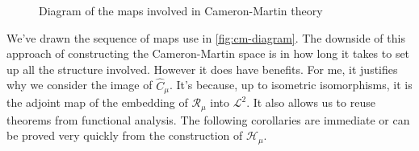 \documentclass[fontsize=12pt, DIV=10]{scrreprt}
\theoremstyle{remark}
\newcommand{\calB}{\mathcal B}
\newcommand{\calH}{\mathcal H}
\newcommand{\calL}{\mathcal L}
\newcommand{\calR}{\mathcal R}
\newcommand{\dif}[1]{\text{d} #1}
\DeclareMathOperator{\ev}{ev}
\DeclareMathOperator{\eq}{eq}
\newcommand{\mudif}{\ensuremath{\, \mu(\dif x)}}
\begin{document}
\begin{figure}
	\centering
	\label{fig:cm-diagram}
	\caption{Diagram of the maps involved in Cameron-Martin theory}
\end{figure}
We've drawn the sequence of maps use in \vref{fig:cm-diagram}. The downside of this approach of constructing the Cameron-Martin space is in how long it takes to set up all the structure involved. However it does have benefits. For me, it justifies why we consider the image of $\hat{C}_{\mu}$. It's because, up to isometric isomorphisms, it is the adjoint map of the embedding of $\calR_{\mu}$ into $\calL^2$. It also allows us to reuse theorems from functional analysis. The following corollaries are immediate or can be proved very quickly from the construction of $\calH_{\mu}$.
\end{document}
